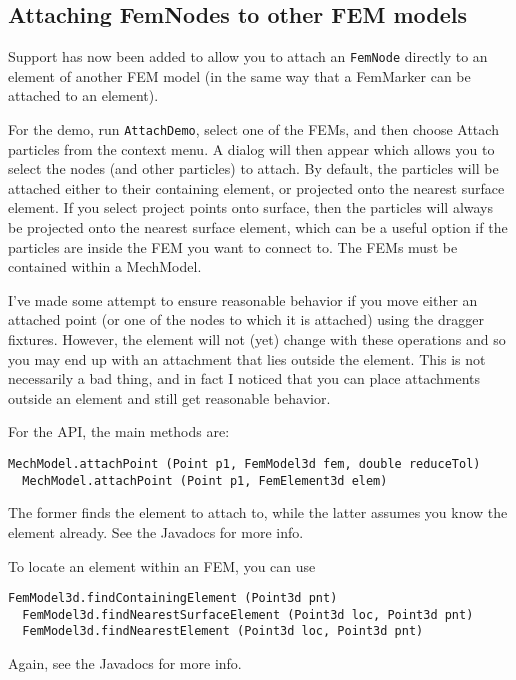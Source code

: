 \documentclass{article}
\begin{document}
\subsection*{Attaching FemNodes to other FEM models}

Support has now been added to allow you to attach an {\tt FemNode}
directly to an element of another FEM model (in the same way that a
FemMarker can be attached to an element).

For the demo, run {\tt AttachDemo}, select one of the FEMs, and then
choose {\sf Attach particles} from the context menu. A dialog will then
appear which allows you to select the nodes (and other particles) to
attach. By default, the particles will be attached either to their
containing element, or projected onto the nearest surface element.  If
you select {\sf project points onto surface}, then the particles will
always be projected onto the nearest surface element, which can be a
useful option if the particles are inside the FEM you want to connect
to. The FEMs must be contained within a MechModel.

I've made some attempt to ensure reasonable behavior if you move
either an attached point (or one of the nodes to which it is attached)
using the dragger fixtures. However, the element will not (yet) change
with these operations and so you may end up with an attachment that
lies outside the element. This is not necessarily a bad thing, and in
fact I noticed that you can place attachments outside an element and
still get reasonable behavior.

For the API, the main methods are:

\begin{lstlisting}[]
  MechModel.attachPoint (Point p1, FemModel3d fem, double reduceTol)
  MechModel.attachPoint (Point p1, FemElement3d elem)
\end{lstlisting}

The former finds the element to attach to, while the latter assumes you
know the element already. See the Javadocs for more info.

To locate an element within an FEM, you can use

\begin{lstlisting}[]
  FemModel3d.findContainingElement (Point3d pnt)
  FemModel3d.findNearestSurfaceElement (Point3d loc, Point3d pnt)
  FemModel3d.findNearestElement (Point3d loc, Point3d pnt)
\end{lstlisting}

Again, see the Javadocs for more info.
\end{document}
